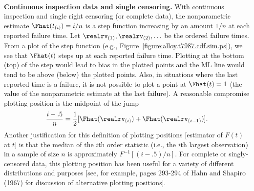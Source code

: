\mbox{ }\\
\noindent
{\bf Continuous inspection data and single censoring.}  With
continuous inspection and single right censoring (or complete data),
the nonparametric estimate $\Fhat(t_{(i)})=i/n$ is a step function
increasing by an amount $1/n$ at each reported failure time.  Let
$\realrv_{(1)},
\realrv_{(2)}, \ldots $ be the ordered failure times.  From a plot of
the step function (e.g.,  Figure~\ref{figure:alloy.t7987.cdf.sim.ps}),
we see that $\Fhat(t)$ steps up at each reported failure time.
Plotting at the bottom (top) of the step would lead to bias in the
plotted points and the ML line would tend to be above (below) the
plotted points.  Also, in situations where the last reported time is a
failure, it is not possible to plot a point at $\Fhat(t)=1$ (the
value of the nonparametric estimate at the last failure).  A
reasonable compromise plotting position is the midpoint of the jump
\begin{equation}
\label{equation:i.minus.p5}
\frac{i-.5}{n} = \frac{1}{2} [\Fhat (\realrv_{(i)})
 		+ \Fhat (\realrv_{(i-1)})].
\end{equation}
Another justification for this definition of plotting positions
[estimator of $F(t)$ at $t$] is that the median of the $i$th order
statistic (i.e., the $i$th largest observation) in a sample of size
$n$ is approximately $ F^{-1} [(i-.5)/n]$.  For complete or
singly-censored data, this plotting position has been useful for a
variety of different distributions and purposes [see, for example,
pages 293-294 of Hahn and Shapiro (1967) for discussion of
alternative plotting positions].
 
